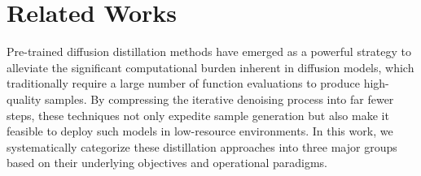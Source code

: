 \section{Related Works}
\label{sec:related}





Pre-trained diffusion distillation methods have emerged as a powerful strategy to alleviate the significant computational burden inherent in diffusion models, which traditionally require a large number of function evaluations to produce high-quality samples. By compressing the iterative denoising process into far fewer steps, these techniques not only expedite sample generation but also make it feasible to deploy such models in low-resource environments. In this work, we systematically categorize these distillation approaches into three major groups based on their underlying objectives and operational paradigms.

